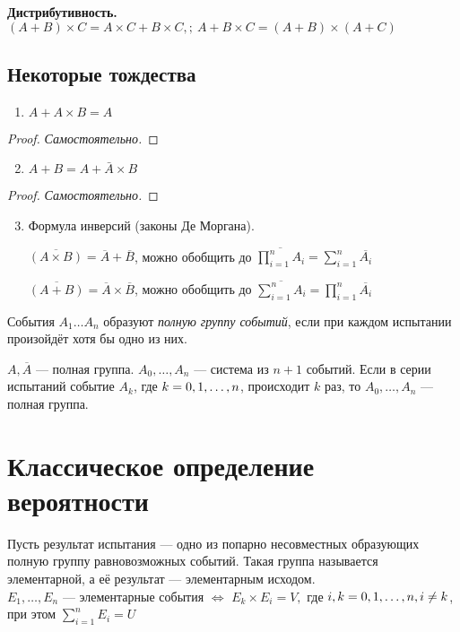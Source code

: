 \textbf{Дистрибутивность.} $(A + B)\times C = A\times C + B\times C, ;\  A + B\times C = (A + B)\times (A + C)$

\subsection{Некоторые тождества}
\begin{enumerate}
	\item $A + A\times B = A$
\end{enumerate}
\begin{proof}
	\textit{Самостоятельно.}
\end{proof}

\begin{enumerate}
	\setcounter{enumi}{1}
	\item{$A + B = A + \bar{A}\times B$}
\end{enumerate}
\begin{proof}
	\textit{Самостоятельно.}
\end{proof}

\begin{enumerate}
	\setcounter{enumi}{2}
	\item Формула инверсий (законы Де Моргана).
	      \smallskip

	      $\overline{(A\times B)} = \overline{A} + \overline{B}$, можно обобщить до $\overline{\prod\limits_{i=1}^n A_i} = \sum\limits_{i=1}^n \overline{A_i} $

	      $\overline{(A + B)} = \overline{A}\times \overline{B}$, можно обобщить до $\overline{\sum\limits_{i=1}^n A_i} = \prod\limits_{i=1}^n \overline{A_i} $
\end{enumerate}
События $A_1 \dots A_n$ образуют \textit{полную группу событий}, если при каждом испытании произойдёт хотя бы одно из них.
\smallskip

\example $A, \overline{A}$ --- полная группа.
\example $A_0, \ldots, A_n$ --- система из $n+1$ событий. Если в серии испытаний событие $A_k$, где $k = 0,1,\dots,n$, происходит $k$ раз, то $A_0, \ldots, A_n$ --- полная группа.

\section{Классическое определение вероятности}
Пусть результат испытания --- одно из попарно несовместных образующих полную группу равновозможных событий. Такая группа называется элементарной, а её результат --- элементарным исходом. \\
$E_1, \dots, E_n$ --- элементарные события $\Leftrightarrow$ $E_k\times E_i = V,$ где $i, k = 0,1,\dots,n, i \not= k$, при этом $\sum\limits_{i = 1}^n E_i = U$

